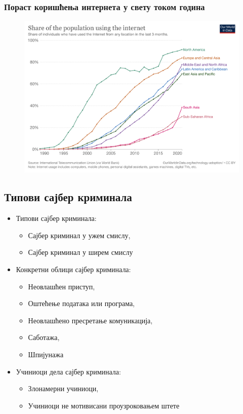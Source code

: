\documentclass{beamer}
\begin{document}
\begin{frame}\frametitle{Пораст коришћења интернета у свету током година}
  \begin{figure}[h]
  \centering
  \includegraphics[width=1.0\textwidth]{koriscenje-interneta-po-godinama.png}
  \end{figure}
\end{frame}

\subsection{Типови сајбер криминала}

\begin{frame}
	\begin{itemize}
		\item Типови сајбер криминала:
		\begin{itemize}
			\item Сајбер криминал у ужем смислу,
			\item Сајбер криминал у ширем смислу
		\end{itemize}
		\item Конкретни облици сајбер криминала:
		\begin{itemize}
			\item Неовлашћен приступ,
			\item Оштећење података или програма,
			\item Неовлашћено пресретање комуникација,
			\item Саботажа,
			\item Шпијунажа
		\end{itemize}
		\item Учиниоци дела сајбер криминала:
		\begin{itemize}
			\item Злонамерни учиниоци,
			\item Учиниоци не мотивисани проузроковањем штете
		\end{itemize}
	\end{itemize}  
\end{frame}
\end{document}
